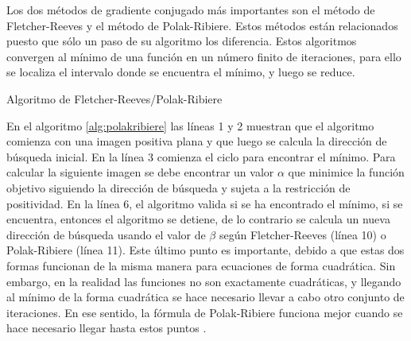 Los dos métodos de gradiente conjugado más importantes son el método de Fletcher-Reeves y el método de Polak-Ribiere. Estos métodos están relacionados puesto que sólo un paso de su algoritmo los diferencia. Estos algoritmos convergen al mínimo de una función en un número finito de iteraciones, para ello se localiza el intervalo donde se encuentra el mínimo, y luego se reduce.

\begin{algorithm}
	\begin{algorithmic}[1]
		\ELSE
		 
		 
		\ENDIF
		\ENDFOR
	\end{algorithmic}
	\caption{Algoritmo de Fletcher-Reeves/Polak-Ribiere}
	\label{alg:polakribiere}
\end{algorithm}

En el algoritmo \ref{alg:polakribiere} las líneas 1 y 2 muestran que el algoritmo comienza con una imagen positiva plana y que luego se calcula la dirección de búsqueda inicial. En la línea 3 comienza el ciclo para encontrar el mínimo. Para calcular la siguiente imagen se debe encontrar un valor $\alpha$ que minimice la función objetivo siguiendo la dirección de búsqueda y sujeta a la restricción de positividad. En la línea 6, el algoritmo valida si se ha encontrado el mínimo, si se encuentra, entonces el algoritmo se detiene, de lo contrario se calcula un nueva dirección de búsqueda usando el valor de $\beta$ según Fletcher-Reeves (línea 10) o Polak-Ribiere (línea 11). Este último punto es importante, debido a que estas dos formas funcionan de la misma manera para ecuaciones de forma cuadrática. Sin embargo, en la realidad las funciones no son exactamente cuadráticas, y llegando al mínimo de la forma cuadrática se hace necesario llevar a cabo otro conjunto de iteraciones. En ese sentido, la fórmula de Polak-Ribiere funciona mejor cuando se hace necesario llegar hasta estos puntos \citep{numericalrecipes}.



